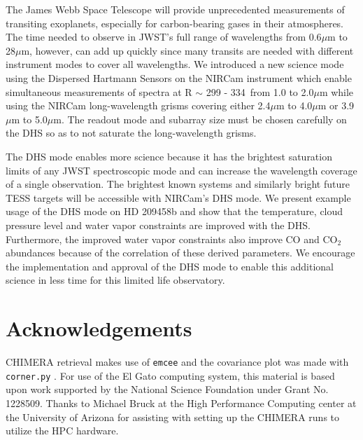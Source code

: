 \documentclass[iop]{emulateapj}
\newcommand{\DHSres}{299 - 334}
\begin{document}
The James Webb Space Telescope will provide unprecedented measurements of transiting exoplanets, especially for carbon-bearing gases in their atmospheres.
The time needed to observe in JWST's full range of wavelengths from 0.6$\mu$m to 28$\mu$m, however, can add up quickly since many transits are needed with different instrument modes to cover all wavelengths.
We introduced a new science mode using the Dispersed Hartmann Sensors on the NIRCam instrument which enable simultaneous measurements of spectra at R $\sim$ \DHSres\ from 1.0 to 2.0$\mu$m while using the NIRCam long-wavelength grisms covering either 2.4$\mu$m to 4.0$\mu$m or 3.9$\mu$m to 5.0$\mu$m.
The readout mode and subarray size must be chosen carefully on the DHS so as to not saturate the long-wavelength grisms.

The DHS mode enables more science because it has the brightest saturation limits of any JWST spectroscopic mode and can increase the wavelength coverage of a single observation.
The brightest known systems and similarly bright future TESS targets will be accessible with NIRCam's DHS mode.
We present example usage of the DHS mode on HD 209458b and show that the temperature, cloud pressure level and water vapor constraints are improved with the DHS.
Furthermore, the improved water vapor constraints also improve CO and CO$_2$ abundances because of the correlation of these derived parameters.
We encourage the implementation and approval of the DHS mode to enable this additional science in less time for this limited life observatory.

\section{Acknowledgements}

CHIMERA retrieval makes use of \texttt{emcee} \citep{foreman-mackey2013emcee} and the covariance plot was made with \texttt{corner.py} \citep{foremanCorner}.
For use of the El Gato computing system, this material is based upon work supported by the National Science Foundation under Grant No. 1228509.
Thanks to Michael Bruck at the High Performance Computing center at the University of Arizona for assisting with setting up the CHIMERA runs to utilize the HPC hardware.

\end{document}
